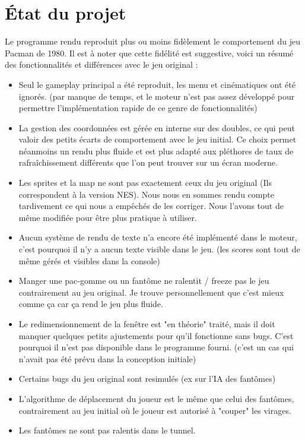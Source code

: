 \documentclass [twoside,a4paper,11pt,french] {report}
\begin{document}
\cleardoublepage


\chapter{État du projet}
    Le programme rendu reproduit plus ou moins fidèlement le comportement du jeu Pacman de 1980.
    Il est à noter que cette fidélité est suggestive, voici un résumé des fonctionnalités et
    différences avec le jeu original :
    \begin{itemize}
        \item Seul le gameplay principal a été reproduit, les menu et cinématiques ont été ignorés. 
        (par manque de temps, et le moteur n'est pas assez développé pour permettre l'implémentation
        rapide de ce genre de fonctionnalités)
        \item La gestion des coordonnées est gérée en interne sur des doubles, ce qui peut valoir des petits 
        écarts de comportement avec le jeu initial. Ce choix permet néanmoins un rendu plus fluide et est plus
        adapté aux pléthores de taux de rafraîchissement différents que l'on peut trouver sur un écran moderne.
        \item Les sprites et la map ne sont pas exactement ceux du jeu original (Ils correspondent à la version NES).
        Nous nous en sommes rendu compte tardivement ce qui nous a empêchés de les corriger. 
        Nous l'avons tout de même modifiée pour être plus pratique à utiliser.
        \item Aucun système de rendu de texte n'a encore été implémenté dans le moteur, c'est pourquoi il n'y a aucun
        texte visible dans le jeu. (les scores sont tout de même gérés et visibles dans la console)
        \item Manger une pac-gomme ou un fantôme ne ralentit / freeze pas le jeu contrairement au jeu original.
        Je trouve personnellement que c'est mieux comme ça car ça rend le jeu plus fluide.
        \item Le redimensionnement de la fenêtre est "en théorie" traité, mais il doit manquer quelques petits
        ajustements pour qu'il fonctionne sans bugs. C'est pourquoi il n'est pas disponible dans le programme fourni.
        (c'est un cas qui n'avait pas été prévu dans la conception initiale)
        \item Certains bugs du jeu original sont resimulés (ex sur l'IA des fantômes)
        \item L'algorithme de déplacement du joueur est le même que celui des fantômes, contrairement au jeu initial
        où le joueur est autorisé à "couper" les virages.
        \item Les fantômes ne sont pas ralentis dans le tunnel.
    \end{itemize}
\end{document}
